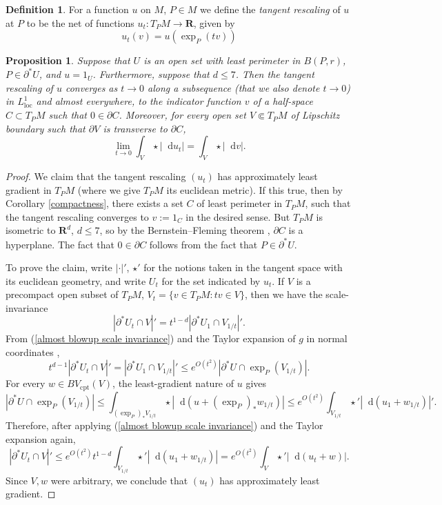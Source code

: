 \documentclass[reqno,12pt,letterpaper]{amsart}
\newcommand{\RR}{\mathbf{R}}
\newcommand*\dif{\mathop{}\!\mathrm{d}}
\newcommand{\dfn}[1]{\emph{#1}\index{#1}}
\newcommand{\loc}{\mathrm{loc}}
\newcommand{\cpt}{\mathrm{cpt}}
\newtheorem{proposition}[theorem]{Proposition}
\theoremstyle{definition}
\newtheorem{definition}[theorem]{Definition}
\numberwithin{equation}{section}
\begin{document}
\begin{definition}
For a function $u$ on $M$, $P \in M$ we define the \dfn{tangent rescaling} of $u$ at $P$ to be the net of functions $u_t: T_PM \to \RR$, given by
$$u_t(v) = u\left(\exp_P(tv)\right)$$
\end{definition}

\begin{proposition}\label{blowup theorem}
Suppose that $U$ is an open set with least perimeter in $B(P, r)$, $P \in \partial^* U$, and $u = 1_U$.
Furthermore, suppose that $d \leq 7$.
Then the tangent rescaling of $u$ converges as $t \to 0$ along a subsequence (that we also denote $t \to 0$) in $L^1_\loc$ and almost everywhere, to the indicator function $v$ of a half-space $C \subset T_PM$ such that $0 \in \partial C$.
Moreover, for every open set $V \Subset T_PM$ of Lipschitz boundary such that $\partial V$ is transverse to $\partial C$,
$$\lim_{t \to 0} \int_V \star |\dif u_t| = \int_V \star |\dif v|.$$
\end{proposition}
\begin{proof}
We claim that the tangent rescaling $(u_t)$ has approximately least gradient in $T_PM$ (where we give $T_PM$ its euclidean metric). If this true, then by Corollary \ref{compactness}, there exists a set $C$ of least perimeter in $T_PM$, such that the tangent rescaling converges to $v := 1_C$ in the desired sense.
But $T_PM$ is isometric to $\RR^d$, $d \leq 7$, so by the Bernstein--Fleming theorem \cite[Theorem 17.3]{Giusti77}, $\partial C$ is a hyperplane.
The fact that $0 \in \partial C$ follows from the fact that $P \in \partial^* U$.

To prove the claim, write $|\cdot|'$, $\star'$ for the notions taken in the tangent space with its euclidean geometry, and write $U_t$ for the set indicated by $u_t$.
If $V$ is a precompact open subset of $T_PM$, $V_t = \{v \in T_PM: tv \in V\}$, then we have the scale-invariance
\begin{equation}\label{almost blowup scale invariance}
|\partial^* U_t \cap V|' = t^{1 - d}|\partial^* U_1 \cap V_{1/t}|'.
\end{equation}
From (\ref{almost blowup scale invariance}) and the Taylor expansion of $g$ in normal coordinates \cite[Lemma 3.4]{schoen1994lectures},
$$t^{d - 1} |\partial^* U_t \cap V|' = |\partial^* U_1 \cap V_{1/t}|' \leq e^{O(t^2)} |\partial^* U \cap \exp_P(V_{1/t})|.$$
For every $w \in BV_\cpt(V)$, the least-gradient nature of $u$ gives
$$|\partial^* U \cap \exp_P(V_{1/t})| \leq \int_{(\exp_P)_* V_{1/t}} \star |\dif(u + (\exp_P)_* w_{1/t})| \leq e^{O(t^2)} \int_{V_{1/t}} \star'|\dif(u_1 + w_{1/t})|'.$$
Therefore, after applying (\ref{almost blowup scale invariance}) and the Taylor expansion again,
$$|\partial^* U_t \cap V|' \leq e^{O(t^2)} t^{1 - d} \int_{V_{1/t}} \star' |\dif (u_1 + w_{1/t})| = e^{O(t^2)} \int_V \star' |\dif (u_t + w)|.$$
Since $V,w$ were arbitrary, we conclude that $(u_t)$ has approximately least gradient.
\end{proof}
\end{document}
